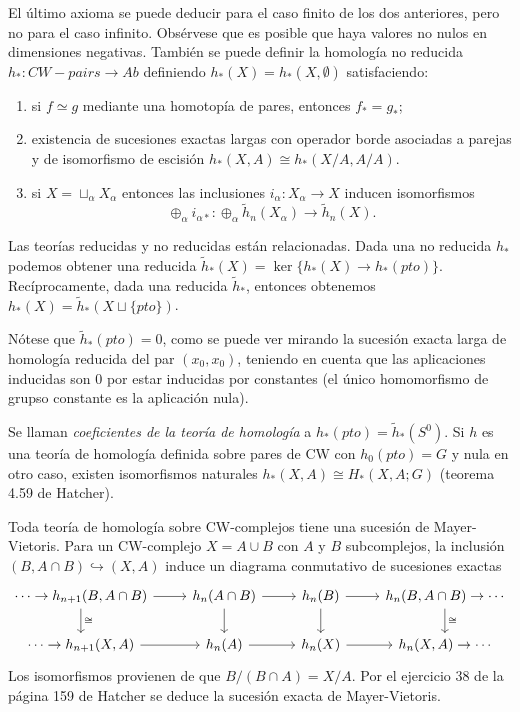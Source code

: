 \documentclass[TA.tex]{subfiles}
\begin{document}
El último axioma se puede deducir para el caso finito de los dos anteriores, pero no para el caso infinito. Obsérvese que es posible que haya valores no nulos en dimensiones negativas. También se puede definir la homología no reducida $h_*:CW-pairs\to Ab$ definiendo $h_*(X)=h_*(X,\emptyset)$ satisfaciendo:
\begin{enumerate}
\item si $f\simeq g$ mediante una homotopía de pares, entonces $f_*=g_*$;
\item existencia de sucesiones exactas largas con operador borde asociadas a parejas y de isomorfismo de escisión $h_*(X,A)\cong h_*(X/A,A/A)$. 
\item si $X=\sqcup_\alpha X_\alpha$ entonces las inclusiones $i_\alpha:X_\alpha\to X$ inducen isomorfismos $$\oplus_\alpha i_{\alpha*}:\oplus_\alpha\tilde{h}_n(X_\alpha)\to \tilde{h}_n(X).$$
\end{enumerate}

Las teorías reducidas y no reducidas están relacionadas. Dada una no reducida $h_*$ podemos obtener una reducida $\tilde{h}_*(X)=\ker\{h_*(X)\to h_*(pto)\}$. Recíprocamente, dada una reducida $\tilde{h}_*$, entonces obtenemos $h_*(X)=\tilde{h}_*(X\sqcup\{pto\})$.

Nótese que $\tilde{h}_*(pto)=0$, como se puede ver mirando la sucesión exacta larga de homología reducida del par $(x_0,x_0)$, teniendo en cuenta que las aplicaciones inducidas son 0 por estar inducidas por constantes (el único homomorfismo de grupso constante es la aplicación nula). 

Se llaman \emph{coeficientes de la teoría de homología} a $h_*(pto)=\tilde{h}_*(S^0)$. Si $h$ es una teoría de homología definida sobre pares de CW con $h_0(pto)=G$ y nula en otro caso, existen isomorfismos naturales $h_*(X,A)\cong H_*(X,A;G)$ (teorema 4.59 de Hatcher). 

Toda teoría de homología sobre CW-complejos tiene una sucesión de Mayer-Vietoris. Para un CW-complejo $X=A\cup B$ con $A$ y $B$ subcomplejos, la inclusión $(B,A\cap B)\hookrightarrow (X,A)$ induce un diagrama conmutativo de sucesiones exactas 
\[
\begin{tikzcd}
\cdots\to h_{n+1}(B,A\cap B)\arrow[r]\arrow[d, "\cong"] & h_n(A\cap B)\arrow[d]\arrow[r] & h_n(B)\arrow[r]\arrow[d] & h_{n}(B,A\cap B)\arrow[d, "\cong"]\to\cdots\\
\cdots\to h_{n+1}(X,A)\arrow[r] & h_n(A)\arrow[r] & h_n(X)\arrow[r] & h_n(X,A)\to\cdots
\end{tikzcd}
\]
Los isomorfismos provienen de que $B/(B\cap A)=X/A$. Por el ejercicio 38 de la página 159 de Hatcher se deduce la sucesión exacta de Mayer-Vietoris.
\end{document}
